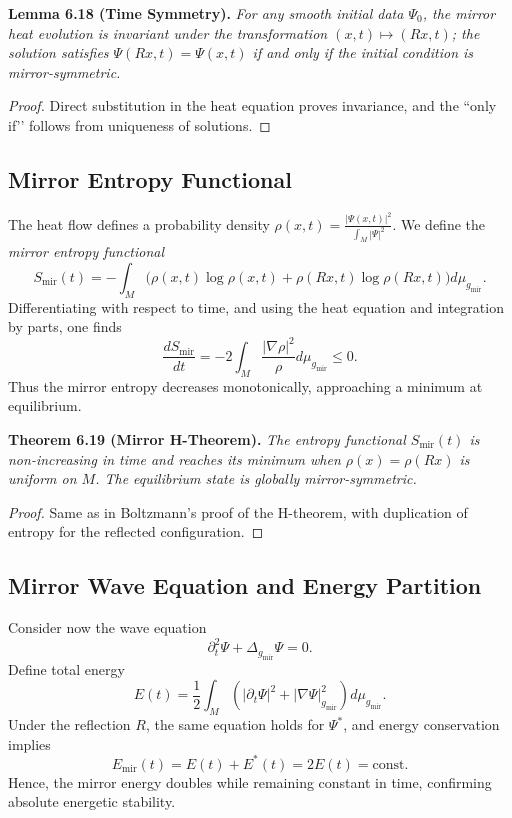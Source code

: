 \noindent
\textbf{Lemma 6.18 (Time Symmetry).}
\emph{For any smooth initial data \(\Psi_{0}\),
the mirror heat evolution is invariant under the transformation
\((x,t)\mapsto(Rx,t)\);
the solution satisfies
\(\Psi(Rx,t)=\Psi(x,t)\)
if and only if the initial condition is mirror-symmetric.}

\begin{proof}
Direct substitution in the heat equation proves invariance,
and the “only if’’ follows from uniqueness of solutions.
\end{proof}

\subsection{Mirror Entropy Functional}\relax \hspace{0pt}

The heat flow defines a probability density
\(\rho(x,t)=\frac{|\Psi(x,t)|^{2}}{\int_{M}|\Psi|^{2}}\).
We define the \emph{mirror entropy functional}
\begin{equation}
S_{\mathrm{mir}}(t)
=-\int_{M}
\big(\rho(x,t)\log\rho(x,t)
+\rho(Rx,t)\log\rho(Rx,t)\big)d\mu_{g_{\mathrm{mir}}}.
\end{equation}
Differentiating with respect to time,
and using the heat equation and integration by parts,
one finds
\[
\frac{dS_{\mathrm{mir}}}{dt}
=-2\int_{M}\frac{|\nabla\rho|^{2}}{\rho}d\mu_{g_{\mathrm{mir}}}
\le 0.
\]
Thus the mirror entropy decreases monotonically,
approaching a minimum at equilibrium.

\noindent
\textbf{Theorem 6.19 (Mirror H-Theorem).}
\emph{The entropy functional \(S_{\mathrm{mir}}(t)\)
is non-increasing in time and reaches its minimum
when \(\rho(x)=\rho(Rx)\) is uniform on \(M\).
The equilibrium state is globally mirror-symmetric.}

\begin{proof}
Same as in Boltzmann’s proof of the H-theorem,
with duplication of entropy for the reflected configuration.
\end{proof}

\subsection{Mirror Wave Equation and Energy Partition}\relax \hspace{0pt}

Consider now the wave equation
\[
\partial_{t}^{2}\Psi + \Delta_{g_{\mathrm{mir}}}\Psi = 0.
\]
Define total energy
\[
E(t)=\frac{1}{2}\int_{M}
\left(|\partial_{t}\Psi|^{2}
+|\nabla\Psi|_{g_{\mathrm{mir}}}^{2}\right)d\mu_{g_{\mathrm{mir}}}.
\]
Under the reflection \(R\),
the same equation holds for \(\Psi^{*}\),
and energy conservation implies
\[
E_{\mathrm{mir}}(t)
=E(t)+E^{*}(t)
=2E(t)
=\text{const}.
\]
Hence, the mirror energy doubles while remaining constant in time,
confirming absolute energetic stability.

